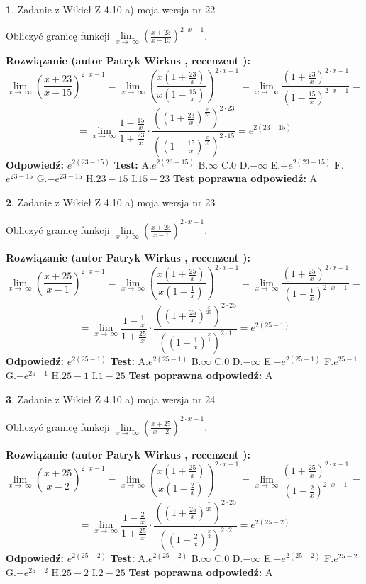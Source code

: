 \documentclass[12pt, a4paper]{article}
\theoremstyle{definition} %
\newtheorem{zad}{}
\newcommand{\zadStart}[1]{\begin{zad}#1\newline}
\newcommand{\zadStop}{\end{zad}}
\newcommand{\rozwStart}[2]{\noindent \textbf{Rozwiązanie (autor #1 , recenzent #2): }\newline}
\newcommand{\rozwStop}{\newline}
\newcommand{\odpStart}{\noindent \textbf{Odpowiedź:}\newline}
\newcommand{\odpStop}{\newline}
\newcommand{\testStart}{\noindent \textbf{Test:}\newline}
\newcommand{\testStop}{\newline}
\newcommand{\kluczStart}{\noindent \textbf{Test poprawna odpowiedź:}\newline}
\newcommand{\kluczStop}{\newline}
\begin{document}
\zadStart{Zadanie z Wikieł Z 4.10 a) moja wersja nr 22}


Obliczyć granicę funkcji  $\lim\limits_{x\to\ \infty}(\frac{x+23}{x-15})^{2\cdot x-1}$.
\zadStop
\rozwStart{Patryk Wirkus}{}
$$\lim\limits_{x\to\ \infty}(\frac{x+23}{x-15})^{2\cdot x-1} = \lim\limits_{x\to\ \infty}(\frac{x(1+\frac{23}{x})}{x(1-\frac{15}{x})})^{2\cdot x-1}=\lim\limits_{x\to\ \infty}\frac{(1+\frac{23}{x})^{2\cdot x-1}}{(1-\frac{15}{x})^{2\cdot x-1}}=$$
$$=\lim\limits_{x\to\ \infty}\frac{1-\frac{15}{x}}{1+\frac{23}{x}}\cdot\frac{((1+\frac{23}{x})^{\frac{x}{23}})^{2\cdot23}}{((1-\frac{15}{x})^{\frac{x}{15}})^{2\cdot15}}=e^{2(23-15)}$$
\rozwStop
\odpStart
$e^{2(23-15)}$
\odpStop
\testStart
A.$e^{2(23-15)}$ B.$\infty$ C.$0$ D.$-\infty$ E.$-e^{2(23-15)}$
F.$e^{23-15}$ G.$-e^{23-15}$
H.$23-15$
I.$15-23$
\testStop
\kluczStart
A
\kluczStop



\zadStart{Zadanie z Wikieł Z 4.10 a) moja wersja nr 23}


Obliczyć granicę funkcji  $\lim\limits_{x\to\ \infty}(\frac{x+25}{x-1})^{2\cdot x-1}$.
\zadStop
\rozwStart{Patryk Wirkus}{}
$$\lim\limits_{x\to\ \infty}(\frac{x+25}{x-1})^{2\cdot x-1} = \lim\limits_{x\to\ \infty}(\frac{x(1+\frac{25}{x})}{x(1-\frac{1}{x})})^{2\cdot x-1}=\lim\limits_{x\to\ \infty}\frac{(1+\frac{25}{x})^{2\cdot x-1}}{(1-\frac{1}{x})^{2\cdot x-1}}=$$
$$=\lim\limits_{x\to\ \infty}\frac{1-\frac{1}{x}}{1+\frac{25}{x}}\cdot\frac{((1+\frac{25}{x})^{\frac{x}{25}})^{2\cdot25}}{((1-\frac{1}{x})^{\frac{x}{1}})^{2\cdot1}}=e^{2(25-1)}$$
\rozwStop
\odpStart
$e^{2(25-1)}$
\odpStop
\testStart
A.$e^{2(25-1)}$ B.$\infty$ C.$0$ D.$-\infty$ E.$-e^{2(25-1)}$
F.$e^{25-1}$ G.$-e^{25-1}$
H.$25-1$
I.$1-25$
\testStop
\kluczStart
A
\kluczStop



\zadStart{Zadanie z Wikieł Z 4.10 a) moja wersja nr 24}


Obliczyć granicę funkcji  $\lim\limits_{x\to\ \infty}(\frac{x+25}{x-2})^{2\cdot x-1}$.
\zadStop
\rozwStart{Patryk Wirkus}{}
$$\lim\limits_{x\to\ \infty}(\frac{x+25}{x-2})^{2\cdot x-1} = \lim\limits_{x\to\ \infty}(\frac{x(1+\frac{25}{x})}{x(1-\frac{2}{x})})^{2\cdot x-1}=\lim\limits_{x\to\ \infty}\frac{(1+\frac{25}{x})^{2\cdot x-1}}{(1-\frac{2}{x})^{2\cdot x-1}}=$$
$$=\lim\limits_{x\to\ \infty}\frac{1-\frac{2}{x}}{1+\frac{25}{x}}\cdot\frac{((1+\frac{25}{x})^{\frac{x}{25}})^{2\cdot25}}{((1-\frac{2}{x})^{\frac{x}{2}})^{2\cdot2}}=e^{2(25-2)}$$
\rozwStop
\odpStart
$e^{2(25-2)}$
\odpStop
\testStart
A.$e^{2(25-2)}$ B.$\infty$ C.$0$ D.$-\infty$ E.$-e^{2(25-2)}$
F.$e^{25-2}$ G.$-e^{25-2}$
H.$25-2$
I.$2-25$
\testStop
\kluczStart
A
\kluczStop
\end{document}
